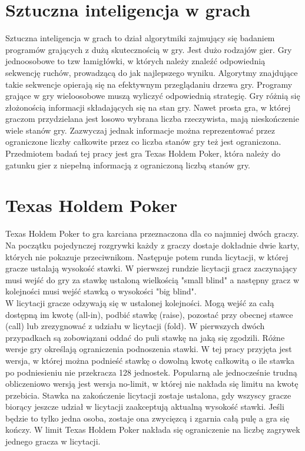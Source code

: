 \documentclass[licencjacka]{pracamgr}
\begin{document}
\section{Sztuczna inteligencja w grach}

Sztuczna inteligencja w grach to dział algorytmiki zajmujący się badaniem programów grających
z dużą skutecznością w gry. Jest dużo rodzajów gier. Gry jednoosobowe to tzw łamigłówki, w których
należy znaleźć odpowiednią sekwencję ruchów, prowadzącą do jak najlepszego wyniku. Algorytmy znajdujące
takie sekwencje opierają się na efektywnym przeglądaniu drzewa gry. Programy grające w gry wieloosobowe
muszą wyliczyć odpowiednią strategię. Gry różnią się złożonością informacji składających się na stan gry.
Nawet prosta gra, w której graczom przydzielana jest losowo wybrana liczba rzeczywista, mają nieskończenie
wiele stanów gry. Zazwyczaj jednak informacje można reprezentować przez ograniczone liczby całkowite przez co
liczba stanów gry też jest ograniczona. Przedmiotem badań tej pracy jest gra Texas Holdem Poker, która
należy do gatunku gier z niepełną informacją z ograniczoną liczbą stanów gry.

\section{Texas Holdem Poker}

Texas Holdem Poker to gra karciana przeznaczona dla co najmniej dwóch graczy. Na początku pojedynczej rozgrywki każdy z graczy
dostaje dokładnie dwie karty, których nie pokazuje przeciwnikom. Następuje potem runda licytacji, w której
gracze ustalają wysokość stawki. W pierwszej rundzie licytacji gracz zaczynający musi wejść do gry
za stawkę ustaloną wielkością "small blind" a następny gracz w kolejności musi wejść stawką o wysokości
"big blind". \\

\noindent
W licytacji gracze odzywają się w ustalonej kolejności. Mogą wejść za całą dostępną im kwotę (all-in), podbić stawkę (raise), pozostać przy
obecnej stawce (call) lub zrezygnować z udziału w licytacji (fold). W pierwszych dwóch przypadkach są
zobowiązani oddać do puli stawkę na jaką się zgodzili. Różne wersje gry określają ograniczenia podnoszenia
stawki. W tej pracy przyjęta jest wersja, w której można podnieść stawkę o dowolną kwotę całkowitą o ile stawka
po podniesieniu nie przekracza 128 jednostek. Popularną ale jednocześnie trudną obliczeniowo wersją
jest wersja no-limit, w której nie nakłada się limitu na kwotę przebicia.
Stawka na zakończenie licytacji zostaje ustalona, gdy
wszyscy gracze biorący jeszcze udział w licytacji zaakceptują aktualną wysokość stawki. Jeśli będzie to
tylko jedna osoba, zostaje ona zwycięzcą i zgarnia całą pulę a gra się kończy. W limit Texas Holdem Poker
nakłada się ograniczenie na liczbę zagrywek jednego gracza w licytacji.\\
\end{document}
